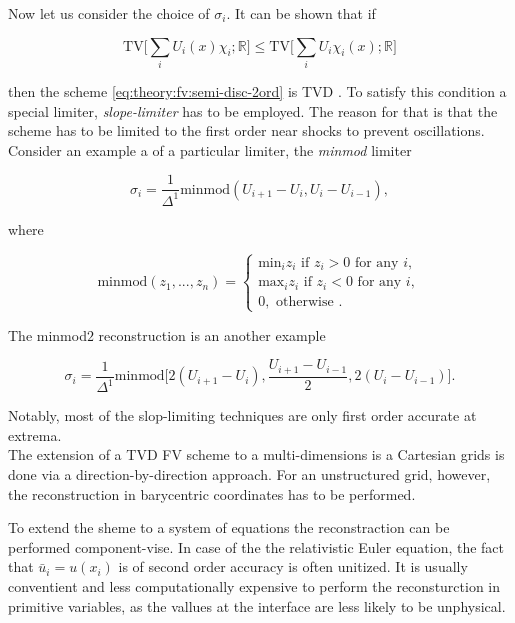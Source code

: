 \documentclass[11pt,a4paper,headinclude=true,DIV=14,BCOR=8mm,chapterprefix,listof=totoc,twoside,openright,abstracton]{scrbook}
\begin{document}
Now let us consider the choice of $\sigma_i$. It can be shown that if 

\begin{equation}
    \text{TV}\Bigg[\sum_{i}U_{i}(x)\chi_{i};\mathbb{R}\Bigg] \leq \text{TV}\Bigg[\sum_{i}U_{i}\chi_{i}(x);\mathbb{R}\Bigg]
\end{equation}

then the scheme \ref{eq:theory:fv:semi-disc-2ord} is TVD \cite{LeVeque:1992}. To satisfy this condition a special limiter, \textit{slope-limiter} has to be employed. The reason for that is that the scheme has to be limited to the first order near shocks to prevent oscillations. Consider an example a of a particular limiter, the \textit{minmod} limiter

\begin{equation}
    \sigma_i = \frac{1}{\Delta^1}\text{minmod}(U_{i+1} - U_{i}, U_{i}-U_{i-1}),
\end{equation}

where

\begin{equation}
    \text{minmod}(z_1,...,z_n) = 
    \begin{cases}
        \text{min}_i z_i \text{ if } z_i > 0 \text{ for any } i, \\
        \text{max}_i z_i \text{ if } z_i < 0 \text{ for any } i, \\
        0,  \text{               otherwise }.
    \end{cases}
\end{equation}

The minmod$2$ reconstruction is an another example 

\begin{equation}
    \sigma_i = \frac{1}{\Delta^1}\text{minmod}\Big[2(U_{i+1} - U_i), \frac{U_{i+1} - U_{i-1}}{2}, 2(U_i - U_{i-1})\Big].
\end{equation}

Notably, most of the slop-limiting techniques are only first order accurate at extrema. \\

The extension of a TVD FV scheme to a multi-dimensions is a Cartesian grids is done via a direction-by-direction approach. For an unstructured grid, however, the reconstruction in barycentric coordinates has to be performed. 

To extend the sheme to a system of equations the reconstraction can be performed component-vise. In case of the the relativistic Euler equation, the fact that $\bar{u}_i = u(x_i)$ is of second order accuracy is often unitized. It is usually conventient and less computationally expensive to perform the reconsturction in primitive variables, as the vallues at the interface are less likely to be unphysical. 
\end{document}
